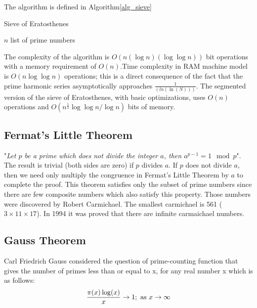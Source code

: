\documentclass[conference]{IEEEtran}
\begin{document}
The algorithm\cite{eratos} is defined in Algorithm\ref{alg_sieve}

\begin{algorithm}
\caption{Sieve of Eratosthenes}
\label{alg_sieve}
\begin{algorithmic}
	\REQUIRE $n$
	\ENSURE list of prime numbers
	
	\ENDFOR
	
	
		\ENDWHILE
		\REPEAT
	\ENDWHILE
\end{algorithmic}
\end{algorithm}

The complexity of the algorithm is $O(n(\log n)(\log \log n))$\cite{sieve_complexity} bit operations with a memory requirement of $O(n)$.Time complexity in RAM machine model is $O(n\log \log n)$ operations; this is a direct consequence of the fact that the prime harmonic series asymptotically approaches $\frac{1}{(ln(\ln(N)))}$. The segmented version of the sieve of Eratosthenes, with basic optimizations, uses $O(n)$ operations and $O(n^{\frac{1}{2}}\log \log n / \log n)$ bits of memory.

\subsection{{\large Fermat's Little Theorem\cite{fermat}}}
"\emph{Let $p$ be a prime which does not divide the integer $a$, then $a^{p-1} = 1 \mod p$}"\cite{fermat}. The result is trivial (both sides are zero) if $p$ divides $a$. If $p$ does not divide $a$, then we need only multiply the congruence in Fermat's Little Theorem by $a$ to complete the proof. This theorem satisfies only the subset of prime numbers since there are few composite numbers which also satisfy this property. Those numbers were discovered by Robert Carmichael. The smallest carmichael is 561 ($3 \times 11 \times 17$). In 1994 it was proved that there are infinite carmaichael numbers.

\subsection{{\large Gauss Theorem}}
Carl Friedrich Gauss considered the question of prime-counting function that gives the number of primes less than or equal to x, for any real number x which is as follows:
	\begin{equation}
	\label{eq:gauss1}
		\frac{\pi(x) \log(x)}{x} \rightarrow 1; \text{ as } x \rightarrow \infty \\
	\end{equation}
\end{document}
